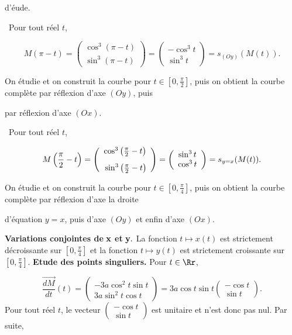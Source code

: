 {\begin{enumerate}
{d'éude.

\textbullet~Pour tout réel $t$,

$$M(\pi-t)=\left(\begin{array}{c}
\cos^3(\pi-t)\\
\sin^3(\pi-t)
\end{array}\right)=\left(\begin{array}{c}
-\cos^3t\\
\sin^3t
\end{array}\right)
=s_{(Oy)}(M(t)).$$

On étudie et on construit la courbe pour $t\in\left[0,\frac{\pi}{2}\right]$, puis on obtient la courbe complète par réflexion
d'axe $(Oy)$, puis

par réflexion d'axe $(Ox)$.

\textbullet~Pour tout réel $t$,

$$M\left(\frac{\pi}{2}-t\right)=\left(\begin{array}{c}
\cos^3\left(\frac{\pi}{2}-t\right)\\
\rule{0mm}{6mm}\sin^3\left(\frac{\pi}{2}-t\right)
\end{array}\right)=\left(\begin{array}{c}
\sin^3t\\
\cos^3t
\end{array}\right)
=s_{y=x}(M(t)).$$

On étudie et on construit la courbe pour $t\in\left[0,\frac{\pi}{4}\right]$, puis on obtient la courbe complète par réflexion
d'axe la droite

d'équation $y=x$, puis d'axe $(Oy)$ et enfin d'axe $(Ox)$.\rule{0mm}{5mm}

\textbf{Variations conjointes de} $\bf{x}$ \textbf{et} $\bf{y.}$ La fonction $t\mapsto x(t)$ est strictement
décroissante sur $\left[0,\frac{\pi}{4}\right]$ et la fonction $t\mapsto y(t)$ est strictement croissante sur
$\left[0,\frac{\pi}{4}\right]$.
\textbf{Etude des points singuliers.} Pour $t\in\Rr$,

$$\overrightarrow{\frac{dM}{dt}}(t)=\left(\begin{array}{c}
-3a\cos^2t\sin t\\
3a\sin^2t\cos t
\end{array}\right)=3a\cos t\sin t\left(\begin{array}{c}
-\cos t\\
\sin t
\end{array}\right).$$
Pour tout réel $t$, le vecteur $\left(\begin{array}{c}
-\cos t\\
\sin t
\end{array}\right)$ est unitaire et n'est donc pas nul. Par suite,

}
\end{enumerate}}
